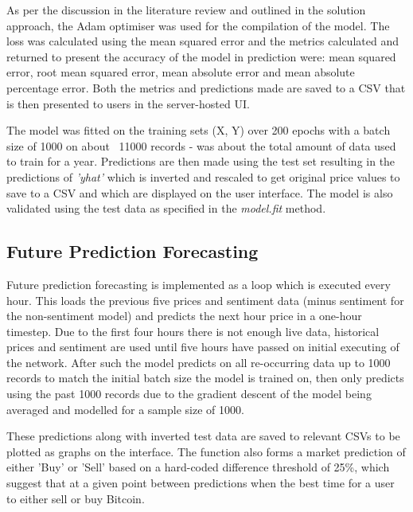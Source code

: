 \documentclass[oneside, 12pt]{article}
\begin{document}
		As per the discussion in the literature review and outlined in the solution approach, the Adam optimiser was used for the compilation of the model. The loss was calculated using the mean squared error and the metrics calculated and returned to present the accuracy of the model in prediction were: mean squared error, root mean squared error, mean absolute error and mean absolute percentage error. Both the metrics and predictions made are saved to a CSV that is then presented to users in the server-hosted UI.
		
		The model was fitted on the training sets (X, Y) over 200 epochs with a batch size of 1000 on about ~11000 records - was about the total amount of data used to train for a year. Predictions are then made using the test set resulting in the predictions of \textit{'yhat'} which is inverted and rescaled to get original price values to save to a CSV and which are displayed on the user interface. The model is also validated using the test data as specified in the \textit{model.fit} method.
		
		\newpage
		
		\subsection{Future Prediction Forecasting}
		
		Future prediction forecasting is implemented as a loop which is executed every hour. This loads the previous five prices and sentiment data (minus sentiment for the non-sentiment model) and predicts the next hour price in a one-hour timestep. Due to the first four hours there is not enough live data, historical prices and sentiment are used until five hours have passed on initial executing of the network. After such the model predicts on all re-occurring data up to 1000 records to match the initial batch size the model is trained on, then only predicts using the past 1000 records due to the gradient descent of the model being averaged and modelled for a sample size of 1000.
		
		These predictions along with inverted test data are saved to relevant CSVs to be plotted as graphs on the interface. The function also forms a market prediction of either 'Buy' or 'Sell' based on a hard-coded difference threshold of 25\%, which suggest that at a given point between predictions when the best time for a user to either sell or buy Bitcoin.
		
\end{document}
